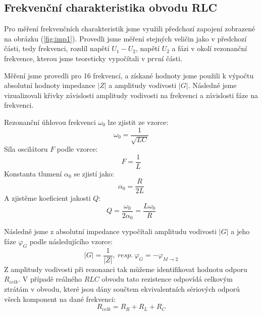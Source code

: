 \documentclass[a4paper,11pt]{article}
\begin{document}
\begin{minipage}[t]{0.5\textwidth}
        \subsection{Frekvenční charakteristika obvodu RLC}
            Pro měření frekvenčních charakteristik jsme využili předchozí zapojení zobrazené na obrázku (\ref{fig:imp1}). Provedli jsme měření stejných veličin jako v předchozí části, tedy frekvenci, rozdíl napětí $U_1 - U_2$, napětí $U_2$ a fázi v okolí rezonanční frekvence, kterou jsme teoreticky vypočítali v první části.  
\end{minipage}
\hspace{10pt}
\begin{minipage}[t]{0.5\textwidth} 
            \vspace{-100pt}
            \par Měření jsme provedli pro 16 frekvencí, a získané hodnoty jsme použili k výpočtu absolutní hodnoty impedance $\vert Z\vert$ a amplitudy vodivosti $\vert G\vert$. Následně jsme vizualizovali křivky závislosti amplitudy vodivosti na frekvenci a závislosti fáze na frekvenci. 
            \par Rezonanční úhlovou frekvenci $\omega_0$ lze zjistit ze vzorce: 
            \begin{equation}
                \omega_0 = \frac{1}{\sqrt{LC}}
            \end{equation}
            Síla oscilátoru $F$ podle vzorce: 
            \begin{equation}
                F = \frac{1}{L}
            \end{equation}
            Konstanta tlumení $\alpha_0$ se zjistí jako: 
            \begin{equation}
                \alpha_0 = \frac{R}{2L}
            \end{equation}
            A zjistěme koeficient jakosti $Q$:
            \begin{equation}
                Q = \frac{\omega_0}{2 \alpha_0} = \frac{L \omega_0}{R}
            \end{equation}
            \par Následně jsme z absolutní impedance vypočítali amplitudu vodivosti $\vert G\vert$ a jeho fáze $\varphi_G$ podle následujícího vzorce:
            \begin{equation}
                \vert G\vert  = \frac{1}{\vert Z\vert}, ~resp.~ \varphi_G = -\varphi_{M\rightarrow 2}
            \end{equation}
            Z amplitudy vodivosti při rezonanci tak můžeme identifikovat hodnotu odporu $R_{celk}$. V případě reálného $RLC$ obvodu tato rezistence odpovídá celkovým ztrátám v obvodu, které jsou dány součtem ekvivalentních sériových odporů všech komponent na dané frekvenci:
            \begin{equation}
                R_{celk} = R_R + R_L + R_C
            \end{equation}

\end{minipage}
\end{document}

